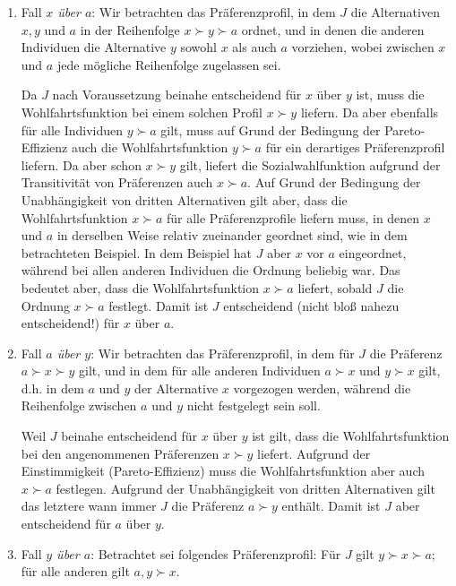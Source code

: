 \begin{enumerate}
  \item Fall {\em $x$ über $a$}: Wir betrachten das Präferenzprofil, in dem
  $J$ die Alternativen $x,y$ und $a$ in der Reihenfolge $x \succ y \succ a$
  ordnet, und in denen die anderen Individuen die Alternative $y$ sowohl $x$
  als auch $a$ vorziehen, wobei zwischen $x$ und $a$ jede mögliche Reihenfolge
  zugelassen sei. 
  
  Da $J$ nach Voraussetzung beinahe entscheidend für $x$ über $y$ ist, muss die
  Wohlfahrtsfunktion bei einem solchen Profil $x \succ y$ liefern. Da aber
  ebenfalls für alle Individuen $y \succ a$ gilt, muss auf Grund der Bedingung
  der Pareto-Effizienz auch die Wohlfahrtsfunktion $y \succ a$ für ein
  derartiges Präferenzprofil liefern. Da aber schon $x \succ y$ gilt, liefert
  die Sozialwahlfunktion aufgrund der Transitivität von Präferenzen auch $x
  \succ a$. Auf Grund der Bedingung der Unabhängigkeit von dritten Alternativen
  gilt aber, dass die Wohlfahrtsfunktion $x \succ a$ für alle Präferenzprofile liefern
  muss, in denen $x$ und $a$ in derselben Weise relativ zueinander geordnet
  sind, wie in dem betrachteten Beispiel. In dem Beispiel hat $J$ aber $x$ vor
  $a$ eingeordnet, während bei allen anderen Individuen die Ordnung beliebig
  war. Das bedeutet aber, dass die Wohlfahrtsfunktion $x \succ a$ liefert,
  sobald $J$ die Ordnung $x \succ a$ festlegt. Damit ist $J$ entscheidend
  (nicht bloß nahezu entscheidend!) für $x$ über $a$.
  
  \item Fall {\em $a$ über $y$}: Wir betrachten das Präferenzprofil, in dem
  für $J$ die Präferenz $a \succ x \succ y$ gilt, und in dem für alle anderen
  Individuen $a \succ x$ und $y \succ x$ gilt, d.h. in dem $a$ und $y$ der
  Alternative $x$ vorgezogen werden, während die Reihenfolge zwischen $a$ und
  $y$ nicht festgelegt sein soll. 
  
  Weil $J$ beinahe entscheidend für $x$ über $y$ ist gilt, dass die
  Wohlfahrtsfunktion bei den angenommenen Präferenzen $x \succ y$ liefert.
  Aufgrund der Einstimmigkeit (Pareto-Effizienz) muss die Wohlfahrtsfunktion
  aber auch $x \succ a$ festlegen. Aufgrund der Unabhängigkeit von dritten
  Alternativen gilt das letztere wann immer $J$ die Präferenz $a \succ y$
  enthält. Damit ist $J$ aber
  entscheidend für $a$ über $y$.
  
  \item Fall {\em $y$ über $a$}: Betrachtet sei folgendes Präferenzprofil: Für
  $J$ gilt $y \succ x \succ a$; für alle anderen gilt $a,y \succ x$. 
  

\end{enumerate}
